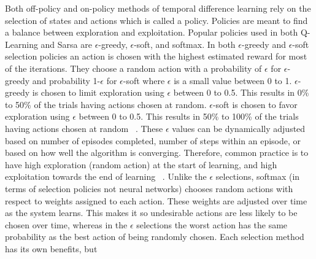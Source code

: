 \documentclass[12pt,american]{report}
\begin{document}
        Both off-policy and on-policy methods of temporal difference learning rely on the selection of states and actions which is called a policy.  Policies are meant to find a balance between exploration and exploitation. Popular policies used in both Q-Learning and Sarsa are \begin{math}\epsilon\end{math}-greedy, \begin{math}\epsilon\end{math}-soft, and softmax.  In both \begin{math}\epsilon\end{math}-greedy and \begin{math}\epsilon\end{math}-soft selection policies an action is chosen with the highest estimated reward for most of the iterations. They choose a random action with a probability of \begin{math}\epsilon\end{math} for \begin{math}\epsilon\end{math}-greedy and probability 1-\begin{math}\epsilon\end{math} for \begin{math}\epsilon\end{math}-soft where \begin{math}\epsilon\end{math} is a small value between 0 to 1. \begin{math}\epsilon\end{math}-greedy is chosen to limit exploration using \begin{math}\epsilon\end{math} between 0 to 0.5. This results in 0\% to 50\% of the trials having actions chosen at random.  \begin{math}\epsilon\end{math}-soft is chosen to favor exploration using \begin{math}\epsilon\end{math} between 0 to 0.5. This results in 50\% to 100\% of the trials having actions chosen at random ~\cite{Eden}. These $\epsilon$ values can be dynamically adjusted based on number of episodes completed, number of steps within an episode, or based on how well the algorithm is converging.  Therefore, common practice is to have high exploration (random action) at the start of learning, and high exploitation towards the end of learning ~\cite{Greedy}.  Unlike the \begin{math}\epsilon\end{math} selections, softmax (in terms of selection policies not neural networks) chooses random actions with respect to weights assigned to each action. These weights are adjusted over time as the system learns. This makes it so undesirable actions are less likely to be chosen over time, whereas in the \begin{math}\epsilon\end{math} selections the worst action has the same probability as the best action of being randomly chosen.  Each selection method has its own benefits, but 
\end{document}
